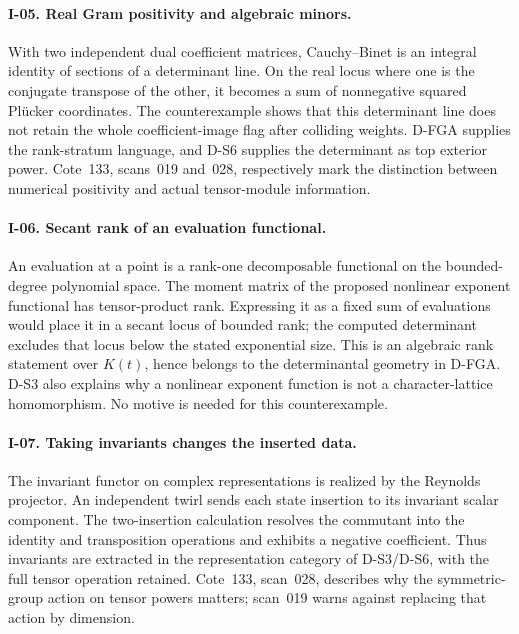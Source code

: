 \paragraph{I-05. Real Gram positivity and algebraic minors.}
With two independent dual coefficient matrices, Cauchy--Binet is an integral identity of sections of a determinant line. On the real locus where one is the conjugate transpose of the other, it becomes a sum of nonnegative squared Pl\"ucker coordinates. The counterexample shows that this determinant line does not retain the whole coefficient-image flag after colliding weights. D-FGA supplies the rank-stratum language, and D-S6 supplies the determinant as top exterior power. Cote~133, scans~019 and~028, respectively mark the distinction between numerical positivity and actual tensor-module information.

\paragraph{I-06. Secant rank of an evaluation functional.}
An evaluation at a point is a rank-one decomposable functional on the bounded-degree polynomial space. The moment matrix of the proposed nonlinear exponent functional has tensor-product rank. Expressing it as a fixed sum of evaluations would place it in a secant locus of bounded rank; the computed determinant excludes that locus below the stated exponential size. This is an algebraic rank statement over $K(t)$, hence belongs to the determinantal geometry in D-FGA. D-S3 also explains why a nonlinear exponent function is not a character-lattice homomorphism. No motive is needed for this counterexample.

\paragraph{I-07. Taking invariants changes the inserted data.}
The invariant functor on complex representations is realized by the Reynolds projector. An independent twirl sends each state insertion to its invariant scalar component. The two-insertion calculation resolves the commutant into the identity and transposition operations and exhibits a negative coefficient. Thus invariants are extracted in the representation category of D-S3/D-S6, with the full tensor operation retained. Cote~133, scan~028, describes why the symmetric-group action on tensor powers matters; scan~019 warns against replacing that action by dimension.

